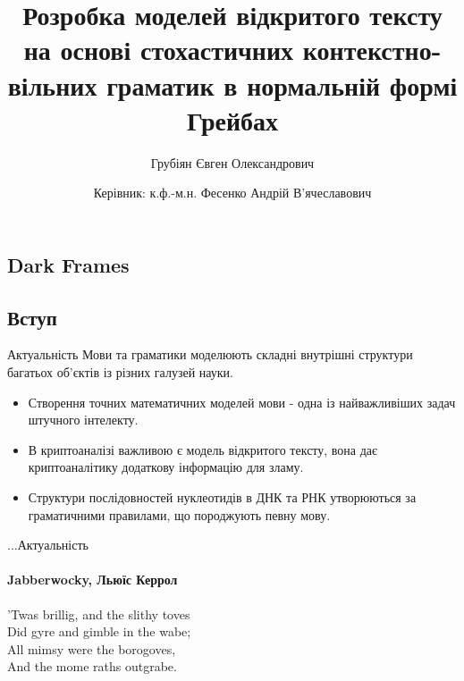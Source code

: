 \documentclass{beamer}
\title{Розробка моделей відкритого тексту на основі стохастичних контекстно-вільних граматик в нормальній формі Грейбах} %
\subtitle{Грубіян Євген Олександрович}
\author{Керівник: к.ф.-м.н. Фесенко Андрій В'ячеславович}
\begin{document}
  \frame{\maketitle}


  \begin{darkframes}
    \section{Dark Frames}
    \subsection{Вступ}
    \begin{frame}{Актуальність}
      Мови та граматики моделюють складні внутрішні структури багатьох об'єктів із різних галузей науки.
      \begin{itemize}
        \item Створення точних математичних моделей мови - одна із найважливіших задач штучного інтелекту.
        \item В криптоаналізі важливою є модель відкритого тексту, вона дає криптоаналітику додаткову інформацію для зламу.
        \item Структури послідовностей нуклеотидів в ДНК та РНК утворюються за граматичними правилами, що породжують певну мову.
      \end{itemize}
    \end{frame}

    \begin{frame}{...Актуальність}
      \framesubtitle{Jabberwocky, Льюїс Керрол}%
      'Twas brillig, and the slithy toves\\
      Did gyre and gimble in the wabe;\\
      All mimsy were the borogoves,\\
      And the mome raths outgrabe.\\\bigskip


\end{frame}
\end{darkframes}
\end{document}

